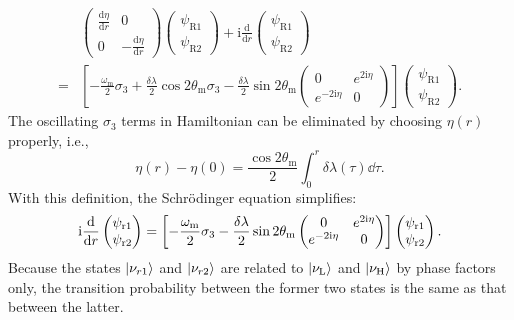 \begin{align*}
    &\begin{pmatrix}  \frac{\mathrm d\eta}{\mathrm dr}  & 0 \\ 0 & - \frac{\mathrm d\eta}{\mathrm d r}  \end{pmatrix} \begin{pmatrix} \psi_{\mathrm R1} \\ \psi_{\mathrm R2} \end{pmatrix} + \mathrm i \frac{\mathrm d}{\mathrm dr} \begin{pmatrix} \psi_{\mathrm R1} \\ \psi_{\mathrm R2} \end{pmatrix} \\
    =& \left[ -\frac{\omega_{\mathrm m} }{2} \sigma_3  + \frac{\delta \lambda}{2} \cos 2\theta_{\mathrm m}  \sigma_3  - \frac{\delta \lambda}{2} \sin 2\theta_{\mathrm m} \begin{pmatrix} 0 & e^{2\mathrm i\eta} \\ e^{-2 \mathrm i\eta } & 0 \end{pmatrix}   \right] \begin{pmatrix} \psi_{\mathrm R1} \\ \psi_{\mathrm R2} \end{pmatrix}.
\end{align*}
The oscillating $\sigma_3$ terms in Hamiltonian can be eliminated by choosing $\eta(r)$ properly, i.e.,
\begin{equation}
    \eta(r) - \eta(0) =  \frac{\cos 2\theta_{\mathrm{m}}}{2} \int_0^r \delta\lambda (\tau) \dd\tau.
\end{equation}
With this definition, the Schr\"{o}dinger equation simplifies:
\begin{equation}
    \ri \frac{\dd}{\dd r} \begin{pmatrix} \psi_{\mathrm r1} \\ \psi_{\mathrm r2} \end{pmatrix} = \left[ - \frac{\omega_{\mathrm m}}{2} \sigma_3 - \frac{\delta \lambda}{2} \sin 2\theta_{\mathrm m} \begin{pmatrix} 0 & e^{2\ri\eta} \\ e^{-2 \ri \eta } & 0 \end{pmatrix}\right] \begin{pmatrix} \psi_{\mathrm r1} \\ \psi_{\mathrm r2} \end{pmatrix}.
    \label{chap:matter-sec:jacobi-subsec:rabi-basis-eqn:eom-rabi-basis-matter}
\end{equation}
Because the states $\left| \nu_{r1}\right\rangle$ and $\left| \nu_{r2}\right\rangle$ are related to $\left| \nu_{\mathrm L}\right\rangle$ and $\left|  \nu_{\mathrm H} \right\rangle$ by phase factors only, the transition probability between the former two states is the same as that between the latter.



